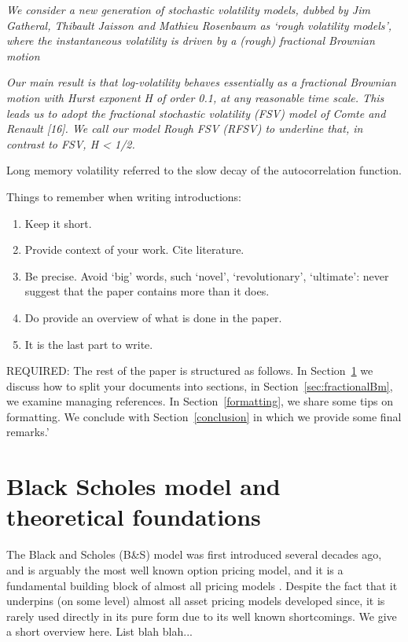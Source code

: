 \documentclass[12pt,oneside]{article}
\begin{document}
\emph{We consider a new generation of stochastic volatility models, dubbed by Jim Gatheral, Thibault Jaisson and Mathieu Rosenbaum as `rough volatility models’, where the instantaneous volatility is driven by a (rough) fractional Brownian motion} %

\emph{Our main result is
that log-volatility behaves essentially as a fractional Brownian motion
with Hurst exponent H of order 0.1, at any reasonable time scale.
This leads us to adopt the fractional stochastic volatility (FSV) model
of Comte and Renault [16]. We call our model Rough FSV (RFSV)
to underline that, in contrast to FSV, H < 1/2.}

Long memory volatility referred to the slow decay of the autocorrelation function.

Things to remember when writing introductions:
\begin{enumerate} %
\label{list:intro_list}
\item Keep it short.
\item Provide context of your work. Cite literature.
\item Be precise. Avoid `big' words, such `novel', `revolutionary', `ultimate': never suggest that the paper contains more than it does.
\item Do provide an overview of what is done in the paper.
\item It is the last part to write.
\end{enumerate}

REQUIRED: The rest of the paper is structured as follows. In Section~\ref{sec:black_scholes_foundations} we discuss how to split your documents into sections, in Section~\ref{sec:fractionalBm}, we examine  managing  references. In Section~\ref{formatting}, we share some tips on formatting. We conclude with Section~\ref{conclusion} in which we provide some final remarks.'



\section{Black Scholes model and theoretical foundations}
\label{sec:black_scholes_foundations}
The Black and Scholes (B&S) model was first introduced several decades ago, and is arguably the most well known option pricing model, and it is a fundamental building block of almost all pricing models \cite{BlackScholesOR}. Despite the fact that it underpins (on some level) almost all asset pricing models developed since, it is rarely used directly in its pure form due to its well known shortcomings. We give a short overview here. List blah blah... 
\end{document}
